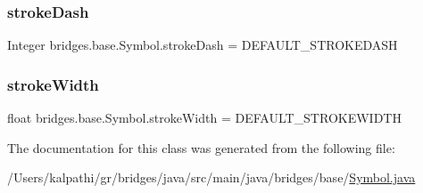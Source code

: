 \subsubsection{\texorpdfstring{strokeDash}{strokeDash}}
{\footnotesize\ttfamily Integer bridges.\+base.\+Symbol.\+stroke\+Dash = D\+E\+F\+A\+U\+L\+T\+\_\+\+S\+T\+R\+O\+K\+E\+D\+A\+SH\hspace{0.3cm}{\ttfamily [protected]}}

\mbox{\label{classbridges_1_1base_1_1_symbol_af00affe40d45a600e3b8c79fce6c9505}} 
\subsubsection{\texorpdfstring{strokeWidth}{strokeWidth}}
{\footnotesize\ttfamily float bridges.\+base.\+Symbol.\+stroke\+Width = D\+E\+F\+A\+U\+L\+T\+\_\+\+S\+T\+R\+O\+K\+E\+W\+I\+D\+TH\hspace{0.3cm}{\ttfamily [protected]}}



The documentation for this class was generated from the following file\+:\begin{DoxyCompactItemize}
\item 
/\+Users/kalpathi/gr/bridges/java/src/main/java/bridges/base/\mbox{\hyperlink{_symbol_8java}{Symbol.\+java}}\end{DoxyCompactItemize}
